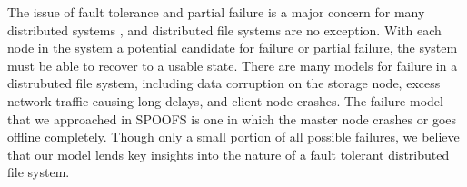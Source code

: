 The issue of fault tolerance and partial failure is a major concern for many distributed systems \cite{waldo_note94}, and distributed file systems are no exception.  With each node in the system a potential candidate for failure or partial failure, the system must be able to recover to a usable state.  There are many models for failure in a distrubuted file system, including data corruption on the storage node, excess network traffic causing long delays, and client node crashes.  The failure model that we approached in SPOOFS is one in which the master node crashes or goes offline completely.  Though only a small portion of all possible failures, we believe that our model lends key insights into the nature of a fault tolerant distributed file system.